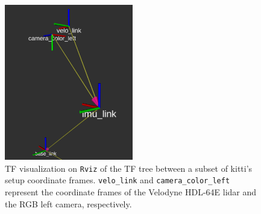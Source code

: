 \begin{figure}[H]
	\centering
	\includegraphics[width=0.5\textwidth]{img/KITTI/tf.png}
	\caption{TF visualization on \texttt{Rviz} of the TF tree between a subset of \ac{kitti}'s setup coordinate frames. \texttt{velo\_link} and \texttt{camera\_color\_left} represent the coordinate frames of the Velodyne HDL-64E \ac{lidar} and the RGB left camera, respectively.}
	\label{fig:kitti-tf-frames}
\end{figure}
